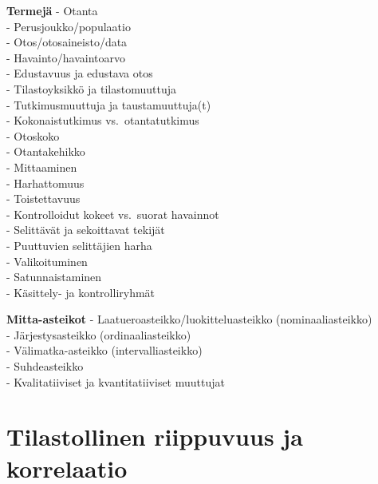 \documentclass[
]{book}
\begin{document}
\textbf{Termejä}
- Otanta\\
- Perusjoukko/populaatio\\
- Otos/otosaineisto/data\\
- Havainto/havaintoarvo\\
- Edustavuus ja edustava otos\\
- Tilastoyksikkö ja tilastomuuttuja\\
- Tutkimusmuuttuja ja taustamuuttuja(t)\\
- Kokonaistutkimus vs.~otantatutkimus\\
- Otoskoko\\
- Otantakehikko\\
- Mittaaminen\\
- Harhattomuus\\
- Toistettavuus\\
- Kontrolloidut kokeet vs.~suorat havainnot\\
- Selittävät ja sekoittavat tekijät\\
- Puuttuvien selittäjien harha\\
- Valikoituminen\\
- Satunnaistaminen\\
- Käsittely- ja kontrolliryhmät

\textbf{Mitta-asteikot}
- Laatueroasteikko/luokitteluasteikko (nominaaliasteikko)\\
- Järjestysasteikko (ordinaaliasteikko)\\
- Välimatka-asteikko (intervalliasteikko)\\
- Suhdeasteikko\\
- Kvalitatiiviset ja kvantitatiiviset muuttujat

\hypertarget{luku6}{%
\chapter{Tilastollinen riippuvuus ja korrelaatio}\label{luku6}}
\end{document}
